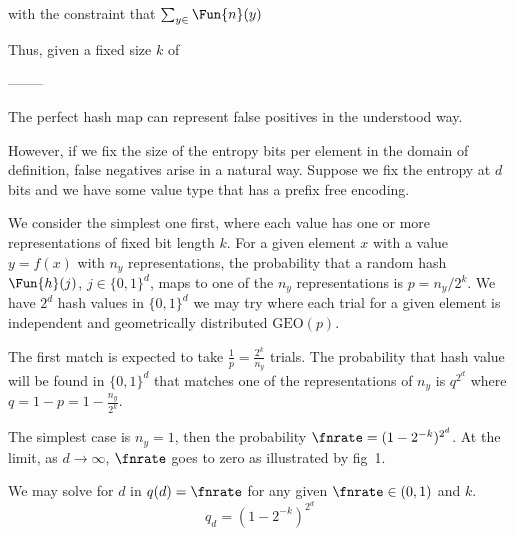 \documentclass[ ../main.tex]{subfiles}
\begin{document}
with the constraint that $\sum_{y \in } \Fun{n}(y)$ 


Thus, given a fixed size $k$ of 



--------





The perfect hash map can represent false positives in the understood way.

However, if we fix the size of the entropy bits per element in the domain of definition, false negatives arise in a natural way.
Suppose we fix the entropy at $d$ bits and we have some value type that has a prefix free encoding.

We consider the simplest one first, where each value has one or more representations of fixed bit length $k$.
For a given element $x$ with a value $y = f(x)$ with $n_y$ representations, the probability that a random hash $\Fun{h}(j)$, $j \in \{0,1\}^d$, maps to one of the $n_y$ representations is $p = n_y / 2^k$.
We have $2^d$ hash values in $\{0,1\}^d$ we may try where each trial for a given element is independent and geometrically distributed $\textrm{GEO}(p)$.

The first match is expected to take $\frac{1}{p} = \frac{2^k}{n_y}$ trials.
The probability that hash value will be found in $\{0,1\}^d$ that matches one of the representations of $n_y$ is $q^{2^d}$ where $q = 1 - p = 1-\frac{n_y}{2^k}$.

The simplest case is $n_y = 1$, then the probability $\fnrate = (1-2^{-k})^{2^d}$.
At the limit, as $d \to \infty$, $\fnrate$ goes to zero as illustrated by fig~1.



We may solve for $d$ in $q(d) = \fnrate$ for any given $\fnrate \in (0,1)$ and $k$.
\begin{equation}
q_d = (1-2^{-k})^{2^d}
\end{equation}
\end{document}
